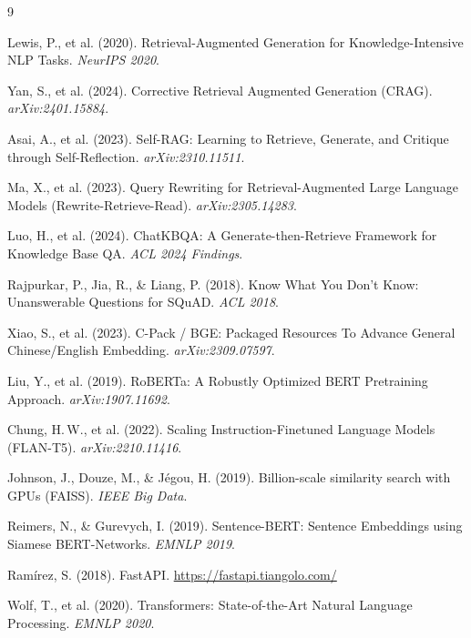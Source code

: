 \documentclass[12pt,a4paper]{article}
\begin{document}
\newpage
\begin{thebibliography}{9}

 Lewis, P., et al. (2020). Retrieval-Augmented Generation for Knowledge-Intensive NLP Tasks. \textit{NeurIPS 2020}.

 Yan, S., et al. (2024). Corrective Retrieval Augmented Generation (CRAG). \textit{arXiv:2401.15884}.

 Asai, A., et al. (2023). Self-RAG: Learning to Retrieve, Generate, and Critique through Self-Reflection. \textit{arXiv:2310.11511}.

 Ma, X., et al. (2023). Query Rewriting for Retrieval-Augmented Large Language Models (Rewrite-Retrieve-Read). \textit{arXiv:2305.14283}.

 Luo, H., et al. (2024). ChatKBQA: A Generate-then-Retrieve Framework for Knowledge Base QA. \textit{ACL 2024 Findings}.

 Rajpurkar, P., Jia, R., \& Liang, P. (2018). Know What You Don't Know: Unanswerable Questions for SQuAD. \textit{ACL 2018}.

 Xiao, S., et al. (2023). C-Pack / BGE: Packaged Resources To Advance General Chinese/English Embedding. \textit{arXiv:2309.07597}.

 Liu, Y., et al. (2019). RoBERTa: A Robustly Optimized BERT Pretraining Approach. \textit{arXiv:1907.11692}.

 Chung, H.\,W., et al. (2022). Scaling Instruction-Finetuned Language Models (FLAN-T5). \textit{arXiv:2210.11416}.

 Johnson, J., Douze, M., \& J\'egou, H. (2019). Billion-scale similarity search with GPUs (FAISS). \textit{IEEE Big Data}.

 Reimers, N., \& Gurevych, I. (2019). Sentence-BERT: Sentence Embeddings using Siamese BERT-Networks. \textit{EMNLP 2019}.

 Ram\'irez, S. (2018). FastAPI. \url{https://fastapi.tiangolo.com/}

 Wolf, T., et al. (2020). Transformers: State-of-the-Art Natural Language Processing. \textit{EMNLP 2020}.

\end{thebibliography}
\end{document}
